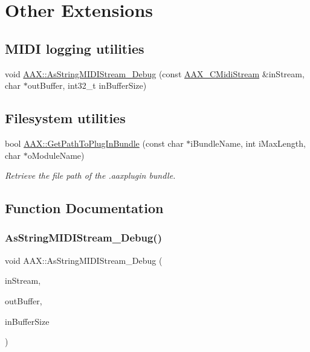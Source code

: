 \hypertarget{a00840}{}\section{Other Extensions}
\label{a00840}


\subsection{ }
\subsection*{M\+I\+DI logging utilities}
\begin{DoxyCompactItemize}
\item 
void \mbox{\hyperlink{a00840_ga5b2751acd531f46a0e4dd68cd0863f46}{A\+A\+X\+::\+As\+String\+M\+I\+D\+I\+Stream\+\_\+\+Debug}} (const \mbox{\hyperlink{a01433}{A\+A\+X\+\_\+\+C\+Midi\+Stream}} \&in\+Stream, char $\ast$out\+Buffer, int32\+\_\+t in\+Buffer\+Size)
\end{DoxyCompactItemize}
\subsection*{Filesystem utilities}
\begin{DoxyCompactItemize}
\item 
bool \mbox{\hyperlink{a00840_ga0bf6aab757ecbd440276bb001de89f19}{A\+A\+X\+::\+Get\+Path\+To\+Plug\+In\+Bundle}} (const char $\ast$i\+Bundle\+Name, int i\+Max\+Length, char $\ast$o\+Module\+Name)
\begin{DoxyCompactList}\small\item\em Retrieve the file path of the .aaxplugin bundle. \end{DoxyCompactList}\end{DoxyCompactItemize}


\subsection{Function Documentation}
\mbox{\label{a00840_ga5b2751acd531f46a0e4dd68cd0863f46}} 
\subsubsection{\texorpdfstring{AsStringMIDIStream\_Debug()}{AsStringMIDIStream\_Debug()}}
{\footnotesize\ttfamily void A\+A\+X\+::\+As\+String\+M\+I\+D\+I\+Stream\+\_\+\+Debug (\begin{DoxyParamCaption}\item[{const \mbox{\hyperlink{a01433}{A\+A\+X\+\_\+\+C\+Midi\+Stream}} \&}]{in\+Stream,  }\item[{char $\ast$}]{out\+Buffer,  }\item[{int32\+\_\+t}]{in\+Buffer\+Size }\end{DoxyParamCaption})}

